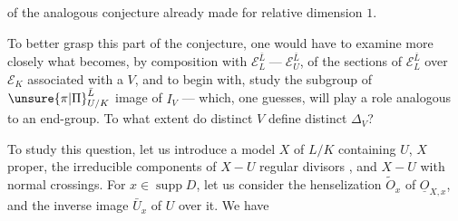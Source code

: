 of the analogous conjecture already made for relative dimension $1$.

To better grasp this  part  of the conjecture, one would have to examine more closely what becomes, by composition with $\mathcal E_L^{\bar L}\mathrel{\text{---}}\mathcal E_U^{\bar L}$, of the sections of $\mathcal E_L^{\bar L}$ over $\mathcal E_K$ associated with a $V$, and to begin with, study the subgroup  of $\unsure{\pi|\Pi}_{U/K}^{\bar L}$ image of $I_V$ --- which, one guesses, will play a role analogous to an end-group. To what extent do distinct $V$ define distinct $\Delta_V$?

To study this question, let us introduce a model $X$ of $L/K$ containing $U$, $X$ proper, the irreducible components of  $X-U$ regular divisors , and $X-U$ with normal crossings. For $x\in\operatorname{supp}D$, let us consider the henselization  $\tilde O_x$ of $\underline{O}_{X,x}$, and the inverse image $\bar U_x$ of $U$ over it. We have
